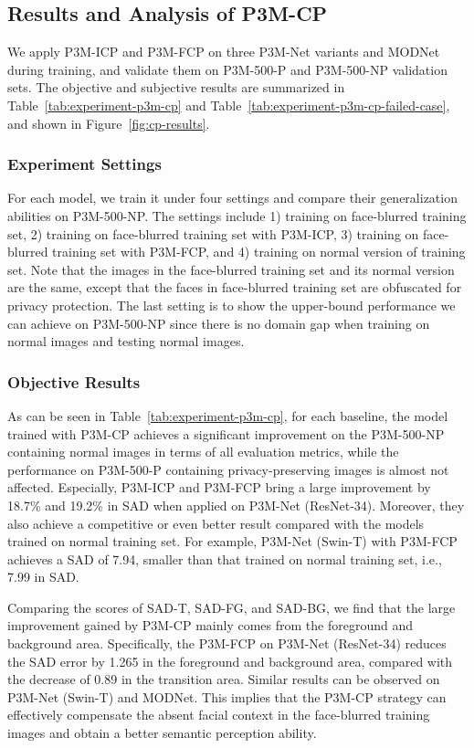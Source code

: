 \documentclass[twocolumn]{svjour3}
\begin{document}
\subsection{Results and Analysis of P3M-CP}\label{sec:p3mcp-results}
We apply P3M-ICP and P3M-FCP on three P3M-Net variants and MODNet during training, and validate them on P3M-500-P and P3M-500-NP validation sets. The objective and subjective results are summarized in Table~\ref{tab:experiment-p3m-cp} and Table~\ref{tab:experiment-p3m-cp-failed-case}, and shown in Figure~\ref{fig:cp-results}.

\subsubsection{Experiment Settings} 
For each model, we train it under four settings and compare their generalization abilities on P3M-500-NP. The settings include 1) training on face-blurred training set, 2) training on face-blurred training set with P3M-ICP, 3) training on face-blurred training set with P3M-FCP, and 4) training on normal version of training set. Note that the images in the face-blurred training set and its normal version are the same, except that the faces in face-blurred training set are obfuscated for privacy protection. The last setting is to show the upper-bound performance we can achieve on P3M-500-NP since there is no domain gap when training on normal images and testing normal images.

\subsubsection{Objective Results} 
As can be seen in Table~\ref{tab:experiment-p3m-cp}, for each baseline, the model trained with P3M-CP achieves a significant improvement on the P3M-500-NP containing normal images in terms of all evaluation metrics, while the performance on P3M-500-P containing privacy-preserving images is almost not affected. Especially, P3M-ICP and P3M-FCP bring a large improvement by 18.7\% and 19.2\% in SAD when applied on P3M-Net (ResNet-34). Moreover, they also achieve a competitive or even better result compared with the models trained on normal training set. For example, P3M-Net (Swin-T) with P3M-FCP achieves a SAD of 7.94, smaller than that trained on normal training set, i.e., 7.99 in SAD.

Comparing the scores of SAD-T, SAD-FG, and SAD-BG, we find that the large improvement gained by P3M-CP mainly comes from the foreground and background area. Specifically, the P3M-FCP on P3M-Net (ResNet-34) reduces the SAD error by 1.265 in the foreground and background area, compared with the decrease of 0.89 in the transition area. Similar results can be observed on P3M-Net (Swin-T) and MODNet. This implies that the P3M-CP strategy can effectively compensate the absent facial context in the face-blurred training images and obtain a better semantic perception ability.
\end{document}
